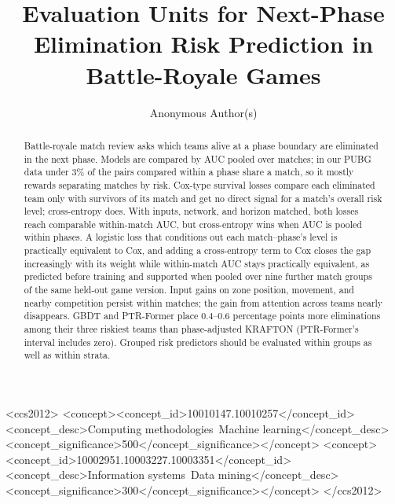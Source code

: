 \documentclass[sigconf,anonymous]{acmart}
\begin{document}
\title{Evaluation Units for Next-Phase Elimination Risk Prediction in Battle-Royale Games}
\renewcommand{\shorttitle}{Evaluation Units for Next-Phase Elimination Prediction}

\author{Anonymous Author(s)}

\begin{abstract}
Battle-royale match review asks which teams alive at a phase boundary are eliminated in the next phase. Models are compared by AUC pooled over matches; in our PUBG data under 3\% of the pairs compared within a phase share a match, so it mostly rewards separating matches by risk. Cox-type survival losses compare each eliminated team only with survivors of its match and get no direct signal for a match's overall risk level; cross-entropy does. With inputs, network, and horizon matched, both losses reach comparable within-match AUC, but cross-entropy wins when AUC is pooled within phases. A logistic loss that conditions out each match--phase's level is practically equivalent to Cox, and adding a cross-entropy term to Cox closes the gap increasingly with its weight while within-match AUC stays practically equivalent, as predicted before training and supported when pooled over nine further match groups of the same held-out game version. Input gains on zone position, movement, and nearby competition persist within matches; the gain from attention across teams nearly disappears. GBDT and PTR-Former place 0.4--0.6 percentage points more eliminations among their three riskiest teams than phase-adjusted KRAFTON (PTR-Former's interval includes zero). Grouped risk predictors should be evaluated within groups as well as within strata.
\end{abstract}
\begin{CCSXML}
<ccs2012>
<concept><concept_id>10010147.10010257</concept_id><concept_desc>Computing methodologies~Machine learning</concept_desc><concept_significance>500</concept_significance></concept>
<concept><concept_id>10002951.10003227.10003351</concept_id><concept_desc>Information systems~Data mining</concept_desc><concept_significance>300</concept_significance></concept>
</ccs2012>
\end{CCSXML}
\maketitle
\end{document}
